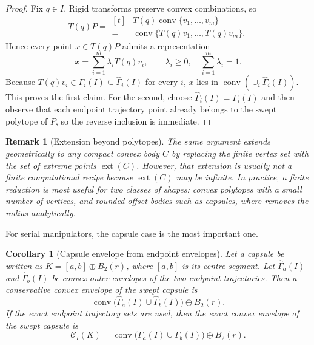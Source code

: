\documentclass[journal]{IEEEtran}
\newtheorem{remark}{Remark}
\newtheorem{corollary}{Corollary}
\begin{document}
\begin{proof}
Fix $q\in I$. Rigid transforms preserve convex combinations, so
\[
T(q)P
= \begin{aligned}[t]
&T(q)\operatorname{conv}\{v_1,\dots,v_m\} \\
=\;&\operatorname{conv}\{T(q)v_1,\dots,T(q)v_m\}.
\end{aligned}
\]
Hence every point $x \in T(q)P$ admits a representation
\[
x = \sum_{i=1}^m \lambda_i T(q)v_i,
\qquad \lambda_i\ge 0,
\quad \sum_{i=1}^m \lambda_i = 1.
\]
Because $T(q)v_i \in \Gamma_i(I) \subseteq \widehat{\Gamma}_i(I)$ for every $i$,
$x$ lies in $\operatorname{conv}(\cup_i \widehat{\Gamma}_i(I))$. This proves the
first claim. For the second, choose
$\widehat{\Gamma}_i(I)=\Gamma_i(I)$ and then observe that each endpoint
trajectory point already belongs to the swept polytope of $P$, so the reverse
inclusion is immediate.
\end{proof}

\begin{remark}[Extension beyond polytopes]\label{rem:general_convex}
The same argument extends geometrically to any compact convex body $C$ by
replacing the finite vertex set with the set of extreme points
$\operatorname{ext}(C)$. However, that extension is usually not a finite
computational recipe because $\operatorname{ext}(C)$ may be infinite. In
practice, a finite reduction is most useful for two classes of shapes: convex
polytopes with a small number of vertices, and rounded offset bodies such as
capsules, where  removes the radius analytically.
\end{remark}

For serial manipulators, the capsule case is the most important one.

\begin{corollary}[Capsule envelope from endpoint envelopes]
\label{cor:capsule_lift}
Let a capsule be written as $K=[a,b]\oplus B_2(r)$, where $[a,b]$ is its centre
segment. Let $\widehat{\Gamma}_a(I)$ and $\widehat{\Gamma}_b(I)$ be convex outer
envelopes of the two endpoint trajectories. Then a conservative convex envelope
of the swept capsule is
\[
\operatorname{conv}\bigl(\widehat{\Gamma}_a(I) \cup
\widehat{\Gamma}_b(I)\bigr) \oplus B_2(r).
\]
If the exact endpoint trajectory sets are used, then the exact convex envelope
of the swept capsule is
\[
\mathcal{C}_I(K)
= \operatorname{conv}\bigl(\Gamma_a(I) \cup \Gamma_b(I)\bigr)
\oplus B_2(r).
\]
\end{corollary}
\end{document}

